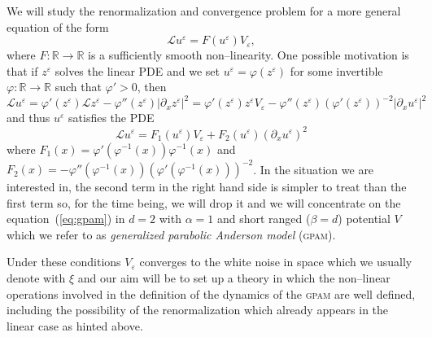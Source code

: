 \documentclass[a4paper,11pt]{article}
\newcommand{\tmem}[1]{{\em #1\/}}
\newcommand{\tmname}[1]{\textsc{#1}}
\newcommand{\LL}{\mathscr{L}}
\begin{document}
We will study the renormalization and convergence problem for a more general
equation of the form
\begin{equation}
  \LL u^{\varepsilon} = F (u^{\varepsilon}) V_{\varepsilon}, \label{eq:gpam}
\end{equation}
where $F : \mathbb{R} \rightarrow \mathbb{R}$ is a sufficiently smooth
non--linearity. One possible motivation is that if $z^{\varepsilon}$ solves
the linear PDE and we set $u^{\varepsilon} = \varphi (z^{\varepsilon})$ for
some invertible $\varphi : \mathbb{R} \rightarrow \mathbb{R}$ such that
$\varphi' > 0$, then
\[ \LL u^{\varepsilon} = \varphi' (z^{\varepsilon}) \LL z^{\varepsilon} -
   \varphi'' (z^{\varepsilon}) | \partial_x z^{\varepsilon} |^2 = \varphi'
   (z^{\varepsilon}) z^{\varepsilon} V_{\varepsilon} - \varphi''
   (z^{\varepsilon}) (\varphi' (z^{\varepsilon}))^{- 2} | \partial_x
   u^{\varepsilon} |^2 \]
and thus $u^{\varepsilon}$ satisfies the PDE
\[ \LL u^{\varepsilon} = F_1 (u^{\varepsilon}) V_{\varepsilon} + F_2
   (u^{\varepsilon}) (\partial_x u^{\varepsilon})^2 \]
where $F_1 (x) = \varphi' (\varphi^{- 1} (x)) \varphi^{- 1} (x)$ and $F_2 (x)
= - \varphi'' (\varphi^{- 1} (x)) (\varphi' (\varphi^{- 1} (x)))^{- 2}$. In
the situation we are interested in, the second term in the right hand side is
simpler to treat than the first term so, for the time being, we will drop it
and we will concentrate on the equation~(\ref{eq:gpam}) in $d = 2$ with
$\alpha = 1$ and short ranged ($\beta = d$) potential $V$ which we refer to as
{\tmem{generalized parabolic Anderson model}} ({\tmname{gpam}}).

Under these conditions $V_{\varepsilon}$ converges to the white noise in
space which we usually denote with $\xi$ and our aim will be to set up a
theory in which the non--linear operations involved in the definition of the
dynamics of the {\tmname{gpam}} are well defined, including the possibility of
the renormalization which already appears in the linear case as hinted above.
\end{document}
